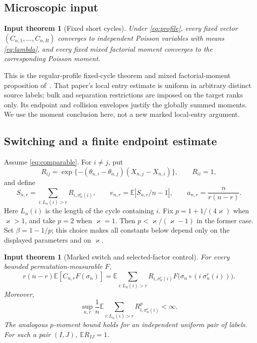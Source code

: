 \documentclass[11pt]{article}
\numberwithin{equation}{section}
\newcommand{\E}{\mathbb E}
\newtheorem{inputtheorem}[theorem]{Input theorem}
\theoremstyle{definition}
\theoremstyle{remark}
\begin{document}
\subsection{Microscopic input}
\begin{inputtheorem}[Fixed short cycles]\label{input:micro}
Under \eqref{eq:profile}, every fixed vector $(C_{n,1},\ldots,C_{n,B})$
converges to independent Poisson variables with means \eqref{eq:lambda},
and every fixed mixed factorial moment converges to the corresponding
Poisson moment.
\end{inputtheorem}
This is the regular-profile fixed-cycle theorem and mixed factorial-moment
proposition of~\cite[Section~3]{LongMicroscopic2026}.  That paper's local
entry estimate is uniform in arbitrary distinct source labels; bulk and
separation restrictions are imposed on the target ranks only.  Its
endpoint and collision envelopes justify the globally summed moments.
We use the moment conclusion here, not a new marked local-entry argument.

\subsection{Switching and a finite endpoint estimate}

Assume \eqref{eq:comparable}.
For $i\ne j$, put
\[
 R_{ij}=\exp\{-(\theta_{n,i}-\theta_{n,j})(X_{n,j}-X_{n,i})\},
 \qquad R_{ii}=1,
\]
and define
\[
 S_{n,r}=\sum_{i:L_n(i)>r}R_{i,\sigma_n^r(i)},\qquad
 e_{n,r}=\E|S_{n,r}/n-1|,\qquad
 a_{n,r}=\frac{n}{r(n-r)}.
\]
Here $L_n(i)$ is the length of the cycle containing $i$.
Fix $p=1+1/(4\varkappa)$ when $\varkappa>1$, and take $p=2$
when $\varkappa=1$.  Then $p<\varkappa/(\varkappa-1)$ in the former
case.  Set $\beta=1-1/p$; this choice makes all constants below depend
only on the displayed parameters and on $\varkappa$.

\begin{inputtheorem}[Marked switch and selected-factor control]
\label{input:switch}
For every bounded permutation-measurable $F$,
\begin{equation}\label{eq:master-switch}
 r(n-r)\E[C_{n,r}F(\sigma_n)]
 =\E\sum_{i:L_n(i)>r}
 R_{i,\sigma_n^r(i)}
 F\bigl(\sigma_n\circ(i\ \sigma_n^r(i))\bigr).
\end{equation}
Moreover,
\begin{equation}\label{eq:selected-p}
 \sup_{n,r}\frac1n\E\sum_{i:L_n(i)>r}
 R_{i,\sigma_n^r(i)}^p<\infty.
\end{equation}
The analogous $p$-moment bound holds for an independent uniform pair of
labels.  For such a pair $(I,J)$, $\E R_{IJ}=1$.
\end{inputtheorem}
\end{document}
